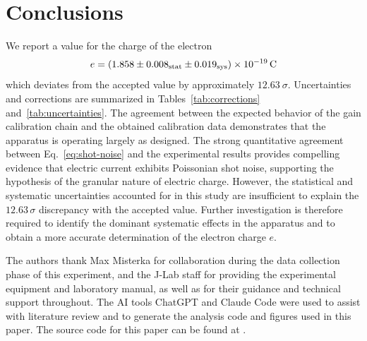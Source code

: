 \documentclass[aps,twocolumn,secnumarabic,balancelastpage,amsmath,amssymb,nofootinbib,floatfix]{revtex4-1}
\begin{document}


\section{Conclusions}
We report a value for the charge of the electron 
\begin{equation}
    e = \left( 1.858 \pm 0.008_{\rm stat} \pm 0.019_{\rm sys} \right) \times 10^{{-19}}\,\text{C}
\end{equation}
which deviates from the accepted value by approximately $12.63 \ \sigma$. Uncertainties and corrections are summarized in Tables~\ref{tab:corrections} and~\ref{tab:uncertainties}. The agreement between the expected behavior of the gain calibration chain and the obtained calibration data demonstrates that the apparatus is operating largely as designed. The strong quantitative agreement between Eq.~\eqref{eq:shot-noise} and the experimental results provides compelling evidence that electric current exhibits Poissonian shot noise, supporting the hypothesis of the granular nature of electric charge. However, the statistical and systematic uncertainties accounted for in this study are insufficient to explain the $12.63\,\sigma$ discrepancy with the accepted value. Further investigation is therefore required to identify the dominant systematic effects in the apparatus and to obtain a more accurate determination of the electron charge $e$.

\begin{acknowledgments} 
The authors thank Max Misterka for collaboration during the data collection phase of this experiment, and the J-Lab staff for providing the experimental equipment and laboratory manual, as well as for their guidance and technical support throughout. The AI tools ChatGPT and Claude Code were used to assist with literature review and to generate the analysis code and figures used in this paper. The source
code for this paper can be found at \cite{suresh_shot_jlab}.
\end{acknowledgments}





\clearpage
\end{document}
